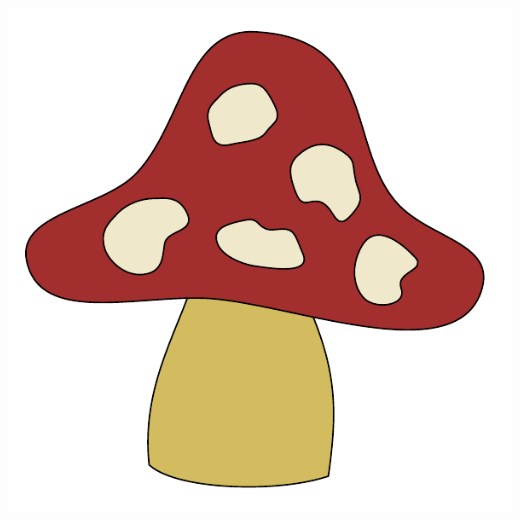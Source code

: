 \documentclass[t]{beamer}
\begin{document}
\begin{frame}
{\begin{center}
				\includegraphics[height=0.8\textheight]{fig/paden}
			\end{center}
		}
	\end{frame}
\end{document}

